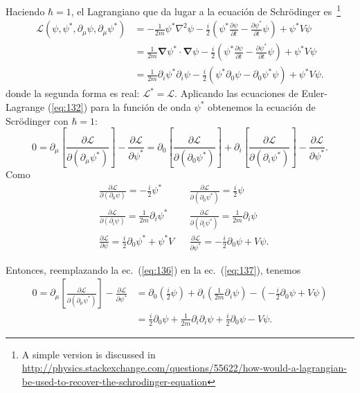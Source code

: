 \begin{frame}
Haciendo $\hbar=1$, el Lagrangiano que da lugar a la ecuaci\'on de Schr\"odinger es~\cite{0712.1608}\footnote{A simple version is discussed in 
\url{http://physics.stackexchange.com/questions/55622/how-would-a-lagrangian-be-used-to-recover-the-schrodinger-equation}}
\begin{align}
\label{eq:5tcc}
  \mathcal{L}(\psi,\psi^*,\partial_\mu\psi,\partial_\mu\psi^*)
  &=-\frac{1}{2m}\psi^*\nabla^2\psi-\frac{i}{2}
  \left(
\psi^*\frac{\partial\psi}{\partial t}-\frac{\partial\psi^*}{\partial t}\psi
  \right)+\psi^*V\psi\\
&=\frac{1}{2m}\boldsymbol{\nabla}\psi^*\cdot\boldsymbol{\nabla}\psi-\frac{i}{2}
  \left(
\psi^*\frac{\partial\psi}{\partial t}-\frac{\partial\psi^*}{\partial t}\psi
  \right)+\psi^*V\psi\\
&=\frac{1}{2m}\partial_i\psi^*\partial_i\psi-\frac{i}{2}
  \left(\psi^*\partial_0\psi-\partial_0\psi^*\psi\right)+\psi^*V\psi.\nonumber
\end{align}
donde la segunda forma es real: $\mathcal{L}^*=\mathcal{L}$. Aplicando las ecuaciones de Euler-Lagrange (\ref{eq:132}) para
la funci\'on de onda $\psi^*$ obtenemos la ecuaci\'on de Scr\"odinger con $\hbar=1$:
\begin{equation}
  \label{eq:137}
    0=\partial_\mu\left[\frac{\partial\mathcal{L}}{\partial(\partial_\mu\psi^*)}\right]-\frac{\partial\mathcal{L}}{\partial\psi^*}=
  \partial_0\left[\frac{\partial\mathcal{L}}{\partial(\partial_0\psi^*)}\right]+  
\partial_i\left[\frac{\partial\mathcal{L}}{\partial(\partial_i\psi^*)}\right]-\frac{\partial\mathcal{L}}{\partial\psi^*}.
\end{equation}
Como
\begin{align}
  \label{eq:136}
  &\frac{\partial\mathcal{L}}{\partial(\partial_0\psi)}=-\frac{i}{2}\psi^*&&\frac{\partial\mathcal{L}}{\partial(\partial_0\psi^*)}=\frac{i}{2}\psi\nonumber\\
  &\frac{\partial\mathcal{L}}{\partial(\partial_i\psi)}=\frac{1}{2m}\partial_i\psi^*&&\frac{\partial\mathcal{L}}{\partial(\partial_i\psi^*)}=\frac{1}{2m}\partial_i\psi\\
  &\frac{\partial\mathcal{L}}{\partial\psi}=\frac{i}{2}\partial_0\psi^*+\psi^*V&&\frac{\partial\mathcal{L}}{\partial\psi^*}=-\frac{i}{2}\partial_0\psi+V\psi.\nonumber
\end{align}
\end{frame}
Entonces, reemplazando la ec.~(\ref{eq:136}) en la ec.~(\ref{eq:137}), tenemos
\begin{align}
 0=\partial_\mu\left[\frac{\partial\mathcal{L}}{\partial(\partial_\mu\psi^*)}\right]-\frac{\partial\mathcal{L}}{\partial\psi^*}
 &=\partial_0\left(\frac{i}{2}\psi\right)+\partial_i\left(\frac{1}{2m}\partial_i\psi\right)
  -\left(-\frac{i}{2}\partial_0\psi+V\psi\right)\nonumber\\
  &=\frac{i}{2}\partial_0\psi+\frac{1}{2m}\partial_i\partial_i\psi+\frac{i}{2}\partial_0\psi-V\psi.
\end{align}

